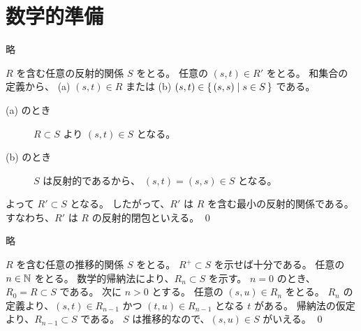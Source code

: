 \chapter{数学的準備}

\begin{jexercise*}[2.2.6]
  略
\end{jexercise*}
\begin{jproof}
  $R$ を含む任意の反射的関係 $S$ をとる。
  任意の $(s, t) \in R'$ をとる。
  和集合の定義から、
    (a) $(s, t) \in R$ または
    (b) $(s, t) \in \{\,(s, s) \mid s \in S\,\}$
    である。
  \begin{description}
    \item[(a) のとき]
      $R \subset S$ より $(s, t) \in S$ となる。
    \item[(b) のとき]
      $S$ は反射的であるから、 $(s, t) = (s, s) \in S$ となる。
  \end{description}
  よって $R' \subset S$ となる。
  したがって、$R'$ は $R$ を含む最小の反射的関係である。
  すなわち、$R'$ は $R$ の反射的閉包といえる。
  \qed
\end{jproof}

\begin{jexercise*}[2.2.7]
  略
\end{jexercise*}
\begin{jproof}
  $R$ を含む任意の推移的関係 $S$ をとる。
  $R^+ \subset S$ を示せば十分である。
  任意の $n \in \mathbb{N}$ をとる。
  数学的帰納法により、$R_n \subset S$ を示す。
  $n = 0$ のとき、$R_0 = R \subset S$ である。
  次に $n > 0$ とする。
  任意の $(s, u) \in R_n$ をとる。
  $R_n$ の定義より、$(s, t) \in R_{n - 1}$ かつ $(t, u) \in R_{n - 1}$ となる $t$ がある。
  帰納法の仮定より、$R_{n - 1} \subset S$ である。
  $S$ は推移的なので、$(s, u) \in S$ がいえる。
  \qed
\end{jproof}
